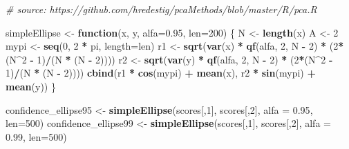 \documentclass[
]{article}
\newenvironment{Shaded}{\begin{snugshade}}{\end{snugshade}}
\newcommand{\CommentTok}[1]{\textcolor[rgb]{0.56,0.35,0.01}{\textit{#1}}}
\newcommand{\ControlFlowTok}[1]{\textcolor[rgb]{0.13,0.29,0.53}{\textbf{#1}}}
\newcommand{\DataTypeTok}[1]{\textcolor[rgb]{0.13,0.29,0.53}{#1}}
\newcommand{\DecValTok}[1]{\textcolor[rgb]{0.00,0.00,0.81}{#1}}
\newcommand{\FloatTok}[1]{\textcolor[rgb]{0.00,0.00,0.81}{#1}}
\newcommand{\KeywordTok}[1]{\textcolor[rgb]{0.13,0.29,0.53}{\textbf{#1}}}
\newcommand{\NormalTok}[1]{#1}
\newcommand{\OperatorTok}[1]{\textcolor[rgb]{0.81,0.36,0.00}{\textbf{#1}}}
\newcommand{\StringTok}[1]{\textcolor[rgb]{0.31,0.60,0.02}{#1}}
\begin{document}
\begin{Shaded}
\begin{Highlighting}[]
\CommentTok{# source: https://github.com/hredestig/pcaMethods/blob/master/R/pca.R}

\NormalTok{simpleEllipse <-}\StringTok{ }\ControlFlowTok{function}\NormalTok{(x, y, }\DataTypeTok{alfa=}\FloatTok{0.95}\NormalTok{, }\DataTypeTok{len=}\DecValTok{200}\NormalTok{) \{}
\NormalTok{  N <-}\StringTok{ }\KeywordTok{length}\NormalTok{(x)}
\NormalTok{  A <-}\StringTok{ }\DecValTok{2}
\NormalTok{  mypi <-}\StringTok{ }\KeywordTok{seq}\NormalTok{(}\DecValTok{0}\NormalTok{, }\DecValTok{2} \OperatorTok{*}\StringTok{ }\NormalTok{pi, }\DataTypeTok{length=}\NormalTok{len)}
\NormalTok{  r1 <-}\StringTok{ }\KeywordTok{sqrt}\NormalTok{(}\KeywordTok{var}\NormalTok{(x) }\OperatorTok{*}\StringTok{ }\KeywordTok{qf}\NormalTok{(alfa, }\DecValTok{2}\NormalTok{, N }\OperatorTok{-}\StringTok{ }\DecValTok{2}\NormalTok{) }\OperatorTok{*}\StringTok{ }\NormalTok{(}\DecValTok{2}\OperatorTok{*}\NormalTok{(N}\OperatorTok{^}\DecValTok{2} \OperatorTok{-}\StringTok{ }\DecValTok{1}\NormalTok{)}\OperatorTok{/}\NormalTok{(N }\OperatorTok{*}\StringTok{ }\NormalTok{(N }\OperatorTok{-}\StringTok{ }\DecValTok{2}\NormalTok{))))}
\NormalTok{  r2 <-}\StringTok{ }\KeywordTok{sqrt}\NormalTok{(}\KeywordTok{var}\NormalTok{(y) }\OperatorTok{*}\StringTok{ }\KeywordTok{qf}\NormalTok{(alfa, }\DecValTok{2}\NormalTok{, N }\OperatorTok{-}\StringTok{ }\DecValTok{2}\NormalTok{) }\OperatorTok{*}\StringTok{ }\NormalTok{(}\DecValTok{2}\OperatorTok{*}\NormalTok{(N}\OperatorTok{^}\DecValTok{2} \OperatorTok{-}\StringTok{ }\DecValTok{1}\NormalTok{)}\OperatorTok{/}\NormalTok{(N }\OperatorTok{*}\StringTok{ }\NormalTok{(N }\OperatorTok{-}\StringTok{ }\DecValTok{2}\NormalTok{))))}
  \KeywordTok{cbind}\NormalTok{(r1 }\OperatorTok{*}\StringTok{ }\KeywordTok{cos}\NormalTok{(mypi) }\OperatorTok{+}\StringTok{ }\KeywordTok{mean}\NormalTok{(x), r2 }\OperatorTok{*}\StringTok{ }\KeywordTok{sin}\NormalTok{(mypi) }\OperatorTok{+}\StringTok{ }\KeywordTok{mean}\NormalTok{(y))}
\NormalTok{\}}


\NormalTok{confidence_ellipse95 <-}\StringTok{ }\KeywordTok{simpleEllipse}\NormalTok{(scores[,}\DecValTok{1}\NormalTok{], scores[,}\DecValTok{2}\NormalTok{], }\DataTypeTok{alfa =} \FloatTok{0.95}\NormalTok{, }\DataTypeTok{len=}\DecValTok{500}\NormalTok{)}
\NormalTok{confidence_ellipse99 <-}\StringTok{ }\KeywordTok{simpleEllipse}\NormalTok{(scores[,}\DecValTok{1}\NormalTok{], scores[,}\DecValTok{2}\NormalTok{], }\DataTypeTok{alfa =} \FloatTok{0.99}\NormalTok{, }\DataTypeTok{len=}\DecValTok{500}\NormalTok{)}


\end{Highlighting}
\end{Shaded}
\end{document}

